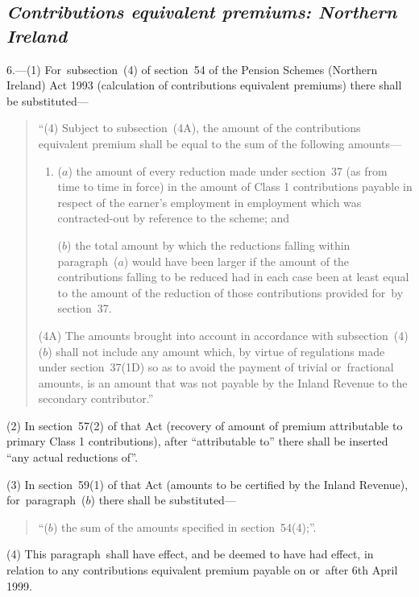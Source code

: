 \documentclass[12pt,a4paper]{article}
\begin{document}
\subsection*{\itshape Contributions equivalent premiums: Northern Ireland}

6.---(1) For~subsection~(4)  of section~54 of the Pension Schemes (Northern Ireland) Act 1993 (calculation of contributions equivalent premiums) there shall be substituted—
\begin{quotation}
“(4) Subject to subsection~(4A), the amount of the contributions equivalent premium shall be equal to the sum of the following amounts—
\begin{enumerate}\item[]
($a$) the amount of every reduction made under section~37 (as from time to time in force) in the amount of Class 1 contributions payable in respect of the earner’s employment in employment which was contracted-out by reference to the scheme; and

($b$) the total amount by which the reductions falling within paragraph~($a$)  would have been larger if the amount of the contributions falling to be reduced had in each case been at least equal to the amount of the reduction of those contributions provided for~by section~37. 
\end{enumerate}

(4A) The amounts brought into account in accordance with subsection~(4)($b$)  shall not include any amount which, by virtue of regulations made under section~37(1D) so as to avoid the payment of trivial or~fractional amounts, is an amount that was not payable by the Inland Revenue to the secondary contributor.”
\end{quotation}

(2) In section~57(2)  of that Act (recovery of amount of premium attributable to primary Class 1 contributions), after “attributable to” there shall be inserted “any actual reductions of”.

(3) In section~59(1)  of that Act (amounts to be certified by the Inland Revenue), for~paragraph~($b$)  there shall be substituted—
\begin{quotation}
“($b$) the sum of the amounts specified in section~54(4);”.
\end{quotation}

(4) This paragraph~shall have effect, and be deemed to have had effect, in relation to any contributions equivalent premium payable on or~after 6th April 1999. 
\end{document}
